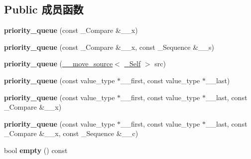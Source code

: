 \subsection*{Public 成员函数}
\begin{DoxyCompactItemize}
\item 
\mbox{\label{classpriority__queue_a7f7e49433b6e858b435b9e06dd3f6af2}} 
{\bfseries priority\+\_\+queue} (const \+\_\+\+Compare \&\+\_\+\+\_\+x)
\item 
\mbox{\label{classpriority__queue_a99dd83a07b5c383d9a82e967321b2a3f}} 
{\bfseries priority\+\_\+queue} (const \+\_\+\+Compare \&\+\_\+\+\_\+x, const \+\_\+\+Sequence \&\+\_\+\+\_\+s)
\item 
\mbox{\label{classpriority__queue_ad670655e3075f9aaa2ad3ece98e372b6}} 
{\bfseries priority\+\_\+queue} (\hyperlink{class____move__source}{\+\_\+\+\_\+move\+\_\+source}$<$ \hyperlink{classpriority__queue}{\+\_\+\+Self} $>$ src)
\item 
\mbox{\label{classpriority__queue_a2d32a12445b09e11c08b29dcceb9d1a8}} 
{\bfseries priority\+\_\+queue} (const value\+\_\+type $\ast$\+\_\+\+\_\+first, const value\+\_\+type $\ast$\+\_\+\+\_\+last)
\item 
\mbox{\label{classpriority__queue_a63e8ef60802c57d1586f4852d00ba165}} 
{\bfseries priority\+\_\+queue} (const value\+\_\+type $\ast$\+\_\+\+\_\+first, const value\+\_\+type $\ast$\+\_\+\+\_\+last, const \+\_\+\+Compare \&\+\_\+\+\_\+x)
\item 
\mbox{\label{classpriority__queue_acbc37968f9b4ec46f4440118d3c28688}} 
{\bfseries priority\+\_\+queue} (const value\+\_\+type $\ast$\+\_\+\+\_\+first, const value\+\_\+type $\ast$\+\_\+\+\_\+last, const \+\_\+\+Compare \&\+\_\+\+\_\+x, const \+\_\+\+Sequence \&\+\_\+\+\_\+c)
\item 
\mbox{\label{classpriority__queue_a86a5c32d2b365af70c20d91ba5b71be6}} 
bool {\bfseries empty} () const
\item 
\mbox{\label{classpriority__queue_a45e2802fb9097bf1484434dc73be3cad}} 

\end{DoxyCompactItemize}
